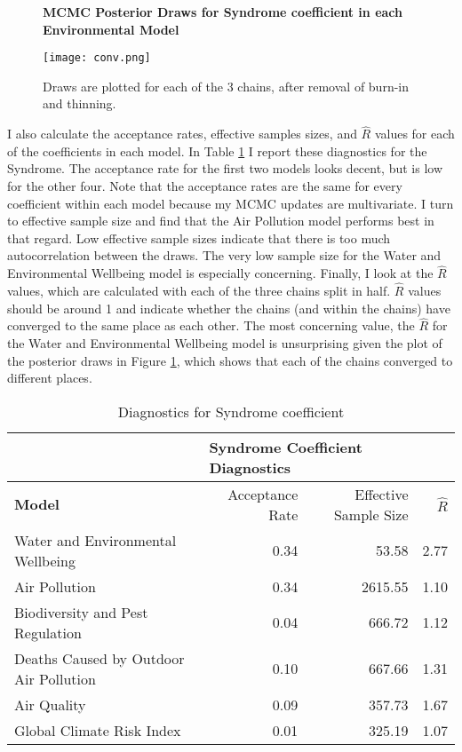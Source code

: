 \documentclass[letterpaper,10.5pt]{article}
\begin{document}
\begin{figure}
\centering
\textbf{MCMC Posterior Draws for Syndrome coefficient in each Environmental Model}\par\medskip
\texttt{[image: conv.png]}
\caption{Draws are plotted for each of the 3 chains, after removal of burn-in and thinning.}
\label{fig:diagSyn}
\end{figure}

I also calculate the acceptance rates, effective samples sizes, and $\hat{R}$ values for each of the coefficients in each model. In Table \ref{diagSyn} I report these diagnostics for the Syndrome. The acceptance rate for the first two models looks decent, but is low for the other four. Note that the acceptance rates are the same for every coefficient within each model because my MCMC updates are multivariate. I turn to effective sample size and find that the Air Pollution model performs best in that regard. Low effective sample sizes indicate that there is too much autocorrelation between the draws. The very low sample size for the Water and Environmental Wellbeing model is especially concerning. Finally, I look at the $\hat{R}$ values, which are calculated with each of the three chains split in half. $\hat{R}$ values should be around 1 and indicate whether the chains (and within the chains) have converged to the same place as each other. The most concerning value, the $\hat{R}$ for the Water and Environmental Wellbeing model is unsurprising given the plot of the posterior draws in Figure \ref{fig:diagSyn}, which shows that each of the chains converged to different places.

\begin{table}[htb]
    \centering
        \caption{Diagnostics for Syndrome coefficient}
    \begin{tabular}{l|r|r|r}
      & \multicolumn{3}{l}{\textbf{Syndrome Coefficient Diagnostics}} \\
     \hline
     \textbf{Model} & Acceptance Rate & Effective Sample Size & $\hat{R}$ \\
    \hline
    Water and Environmental Wellbeing & 0.34 & 53.58 & 2.77 \\
    Air Pollution  & 0.34 & 2615.55 & 1.10 \\
    Biodiversity and Pest Regulation  & 0.04 & 666.72 & 1.12 \\
    Deaths Caused by Outdoor Air Pollution  & 0.10 & 667.66 & 1.31 \\
    Air Quality & 0.09 & 357.73 & 1.67 \\
    Global Climate Risk Index  & 0.01 & 325.19 & 1.07 \\
    \end{tabular}
    \label{diagSyn}
\end{table}
\end{document}
